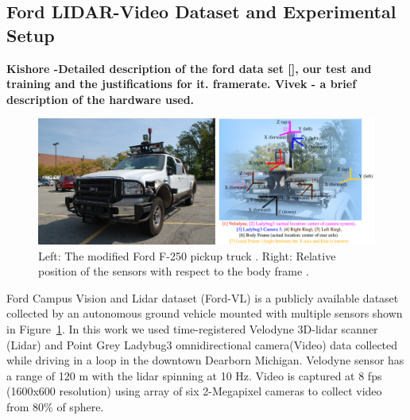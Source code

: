 \documentclass{article}
\begin{document}
\subsection{Ford LIDAR-Video Dataset and Experimental Setup} %
\label{sub:ford_lidar_video_dataset_and_experimental_setup}

\textbf{ Kishore -Detailed description of the ford data set [], our test and training and the justifications for it. framerate. 
Vivek - a brief description of the hardware used. }

\begin{figure}[htbp]
    \centering
        \includegraphics[scale=0.45]{Figures/ford-truck-sensors.png}
    \caption{Left: The modified Ford F-250 pickup truck \cite{Pandey2011Ford-campu}. Right: Relative position of the sensors with respect to the body frame \cite{Pandey2011Ford-campu}.}
    \label{fig:ford-truck-sensors}
\end{figure}

Ford Campus Vision and Lidar dataset \cite{Pandey2011Ford-campu} (Ford-VL) is a publicly available dataset collected by an autonomous ground vehicle mounted with multiple sensors shown in Figure~\ref{fig:ford-truck-sensors}. In this work we used time-registered Velodyne 3D-lidar scanner (Lidar) and Point Grey Ladybug3 omnidirectional camera(Video) data collected while driving in a loop in the downtown Dearborn Michigan. Velodyne sensor has a range of 120 m with the lidar spinning at 10 Hz. Video is captured at 8 fps (1600x600 resolution) using array of six 2-Megapixel cameras to collect video from 80\% of sphere.  
\end{document}
